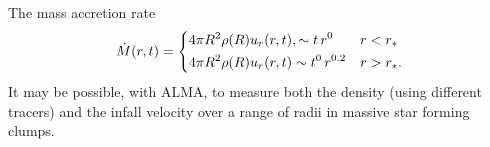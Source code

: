 \documentclass[iop,apj,numberedappendix]{emulateapj}
\newcommand       \be		{\begin{equation}}
\newcommand       \ee		{\end{equation}}
\begin{document}
The mass accretion rate 
%
\be
\dot M(r,t)=
\begin{dcases}
4\pi R^2\rho(R)u_r(r,t), \sim t\,r^{0} & r<r_*\\
4\pi R^2\rho(R)u_r(r,t) \sim t^0\,r^{0.2} & r>r_*.
\end{dcases}
\ee
%
It may be possible, with ALMA, to measure both the density (using
different tracers) and the infall velocity over a range of radii in
massive star forming clumps.


\end{document}
